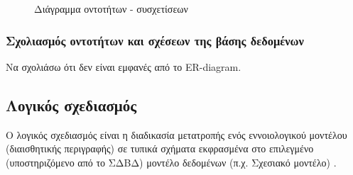 \documentclass{assignment}
\begin{document}
\begin{figure}
\begin{center}
\caption{Διάγραμμα οντοτήτων - συσχετίσεων}
\label{fig:ER:diagram}
\end{center}
\end{figure}

\subsubsection{Σχολιασμός οντοτήτων και σχέσεων της βάσης δεδομένων}
Να σχολιάσω ότι δεν είναι εμφανές από το ER-diagram.

\subsection{Λογικός σχεδιασμός}

Ο λογικός σχεδιασμός είναι η διαδικασία μετατροπής ενός εννοιολογικού μοντέλου (διαισθητικής περιγραφής) σε τυπικά σχήματα εκφρασμένα στο επιλεγμένο (υποστηριζόμενο από το ΣΔΒΔ) μοντέλο δεδομένων (π.χ. Σχεσιακό μοντέλο) \cite{class_notes}.
\end{document}
